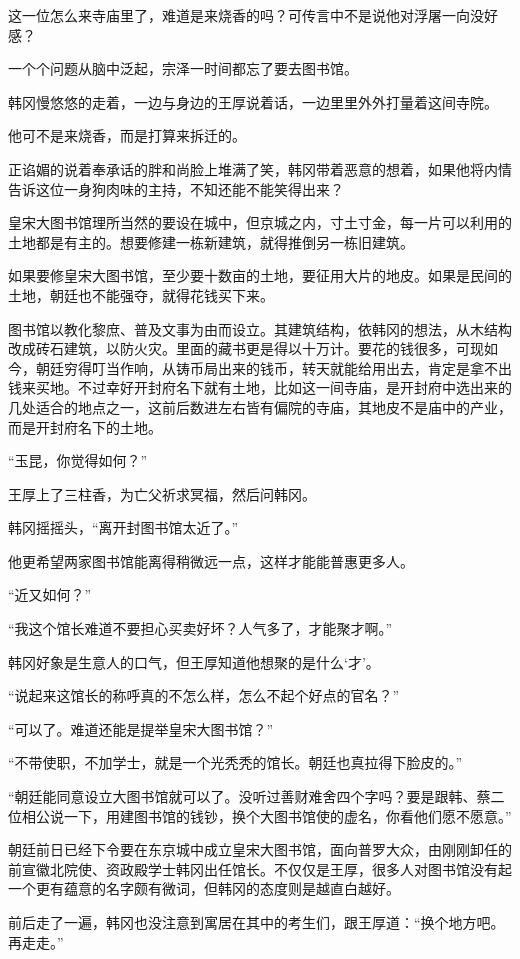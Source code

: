 这一位怎么来寺庙里了，难道是来烧香的吗？可传言中不是说他对浮屠一向没好感？

一个个问题从脑中泛起，宗泽一时间都忘了要去图书馆。

韩冈慢悠悠的走着，一边与身边的王厚说着话，一边里里外外打量着这间寺院。

他可不是来烧香，而是打算来拆迁的。

正谄媚的说着奉承话的胖和尚脸上堆满了笑，韩冈带着恶意的想着，如果他将内情告诉这位一身狗肉味的主持，不知还能不能笑得出来？

皇宋大图书馆理所当然的要设在城中，但京城之内，寸土寸金，每一片可以利用的土地都是有主的。想要修建一栋新建筑，就得推倒另一栋旧建筑。

如果要修皇宋大图书馆，至少要十数亩的土地，要征用大片的地皮。如果是民间的土地，朝廷也不能强夺，就得花钱买下来。

图书馆以教化黎庶、普及文事为由而设立。其建筑结构，依韩冈的想法，从木结构改成砖石建筑，以防火灾。里面的藏书更是得以十万计。要花的钱很多，可现如今，朝廷穷得叮当作响，从铸币局出来的钱币，转天就能给用出去，肯定是拿不出钱来买地。不过幸好开封府名下就有土地，比如这一间寺庙，是开封府中选出来的几处适合的地点之一，这前后数进左右皆有偏院的寺庙，其地皮不是庙中的产业，而是开封府名下的土地。

“玉昆，你觉得如何？”

王厚上了三柱香，为亡父祈求冥福，然后问韩冈。

韩冈摇摇头，“离开封图书馆太近了。”

他更希望两家图书馆能离得稍微远一点，这样才能能普惠更多人。

“近又如何？”

“我这个馆长难道不要担心买卖好坏？人气多了，才能聚才啊。”

韩冈好象是生意人的口气，但王厚知道他想聚的是什么‘才’。

“说起来这馆长的称呼真的不怎么样，怎么不起个好点的官名？”

“可以了。难道还能是提举皇宋大图书馆？”

“不带使职，不加学士，就是一个光秃秃的馆长。朝廷也真拉得下脸皮的。”

“朝廷能同意设立大图书馆就可以了。没听过善财难舍四个字吗？要是跟韩、蔡二位相公说一下，用建图书馆的钱钞，换个大图书馆使的虚名，你看他们愿不愿意。”

朝廷前日已经下令要在东京城中成立皇宋大图书馆，面向普罗大众，由刚刚卸任的前宣徽北院使、资政殿学士韩冈出任馆长。不仅仅是王厚，很多人对图书馆没有起一个更有蕴意的名字颇有微词，但韩冈的态度则是越直白越好。

前后走了一遍，韩冈也没注意到寓居在其中的考生们，跟王厚道：“换个地方吧。再走走。”

